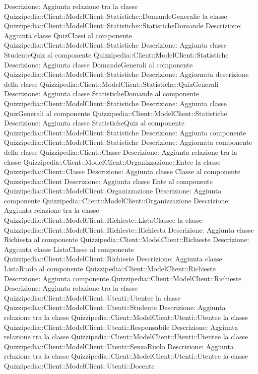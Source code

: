 Descrizione: Aggiunta relazione tra la classe Quizzipedia::Client::ModelClient::Statistiche::DomandeGeneralie la classe Quizzipedia::Client::ModelClient::Statistiche::StatisticheDomande 
Descrizione: Aggiunta classe QuizClassi al componente Quizzipedia::Client::ModelClient::Statistiche 
Descrizione: Aggiunta classe StudenteQuiz al componente Quizzipedia::Client::ModelClient::Statistiche 
Descrizione: Aggiunta classe DomandeGenerali al componente Quizzipedia::Client::ModelClient::Statistiche 
Descrizione: Aggiornata descrizione della classe Quizzipedia::Client::ModelClient::Statistiche::QuizGenerali 
Descrizione: Aggiunta classe StatisticheDomande al componente Quizzipedia::Client::ModelClient::Statistiche 
Descrizione: Aggiunta classe QuizGenerali al componente Quizzipedia::Client::ModelClient::Statistiche 
Descrizione: Aggiunta classe StatisticheQuiz al componente Quizzipedia::Client::ModelClient::Statistiche 
Descrizione: Aggiunta componente Quizzipedia::Client::ModelClient::Statistiche 
Descrizione: Aggiornata componente della classe Quizzipedia::Client::Classe 
Descrizione: Aggiunta relazione tra la classe Quizzipedia::Client::ModelClient::Organizzazione::Entee la classe Quizzipedia::Client::Classe 
Descrizione: Aggiunta classe Classe al componente Quizzipedia::Client 
Descrizione: Aggiunta classe Ente al componente Quizzipedia::Client::ModelClient::Organizzazione 
Descrizione: Aggiunta componente Quizzipedia::Client::ModelClient::Organizzazione 
Descrizione: Aggiunta relazione tra la classe Quizzipedia::Client::ModelClient::Richieste::ListaClassee la classe Quizzipedia::Client::ModelClient::Richieste::Richiesta 
Descrizione: Aggiunta classe Richiesta al componente Quizzipedia::Client::ModelClient::Richieste 
Descrizione: Aggiunta classe ListaClasse al componente Quizzipedia::Client::ModelClient::Richieste 
Descrizione: Aggiunta classe ListaRuolo al componente Quizzipedia::Client::ModelClient::Richieste 
Descrizione: Aggiunta componente Quizzipedia::Client::ModelClient::Richieste 
Descrizione: Aggiunta relazione tra la classe Quizzipedia::Client::ModelClient::Utenti::Utentee la classe Quizzipedia::Client::ModelClient::Utenti::Studente 
Descrizione: Aggiunta relazione tra la classe Quizzipedia::Client::ModelClient::Utenti::Utentee la classe Quizzipedia::Client::ModelClient::Utenti::Responsabile 
Descrizione: Aggiunta relazione tra la classe Quizzipedia::Client::ModelClient::Utenti::Utentee la classe Quizzipedia::Client::ModelClient::Utenti::SenzaRuolo 
Descrizione: Aggiunta relazione tra la classe Quizzipedia::Client::ModelClient::Utenti::Utentee la classe Quizzipedia::Client::ModelClient::Utenti::Docente 

